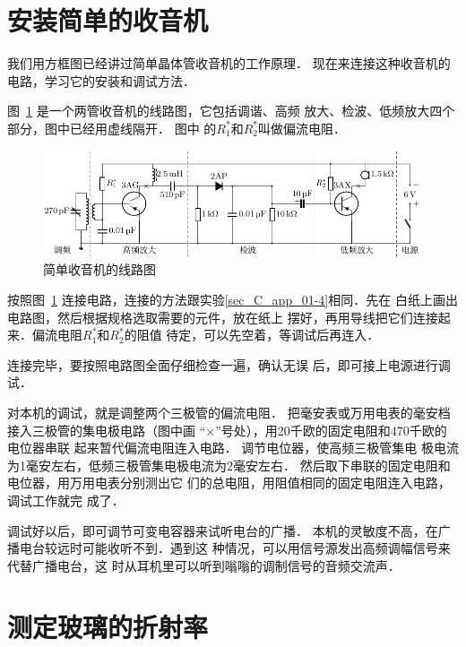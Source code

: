 \section{安装简单的收音机}
我们用方框图已经讲过简单晶体管收音机的工作原理．
现在来连接这种收音机的电路，学习它的安装和调试方法．

图~\ref{fig_C_10-6} 是一个两管收音机的线路图，它包括调谐、高频
放大、检波、低频放大四个部分，图中已经用虚线隔开．
图中
的$R_1^*$和$R_2^*$叫做偏流电阻．
\begin{figure}[htbp]
    \centering
    \includegraphics{fig/C/10-6.pdf}
    \caption{简单收音机的线路图}\label{fig_C_10-6}
\end{figure}

按照图~\ref{fig_C_10-6} 连接电路，连接的方法跟实验\ref{sec_C_app_01-4}相同．先在
白纸上画出电路图，然后根据规格选取需要的元件，放在纸上
摆好，再用导线把它们连接起来．偏流电阻$R_1^*$和$R_2^*$的阻值
待定，可以先空着，等调试后再连入．

连接完毕，要按照电路图全面仔细检查一遍，确认无误
后，即可接上电源进行调试．

对本机的调试，就是调整两个三极管的偏流电阻．
把毫安表或万用电表的毫安档接入三极管的集电极电路（图中画
“$\times$”号处），用20千欧的固定电阻和470千欧的电位器串联
起来暂代偏流电阻连入电路．
调节电位器，使高频三极管集电
极电流为1毫安左右，低频三极管集电极电流为2毫安左右．
然后取下串联的固定电阻和电位器，用万用电表分别测出它
们的总电阻，用阻值相同的固定电阻连入电路，调试工作就完
成了．

调试好以后，即可调节可变电容器来试听电台的广播．
本机的灵敏度不高，在广播电台较远时可能收听不到．遇到这
种情况，可以用信号源发出高频调幅信号来代替广播电台，这
时从耳机里可以听到嗡嗡的调制信号的音频交流声．

\section{测定玻璃的折射率}

